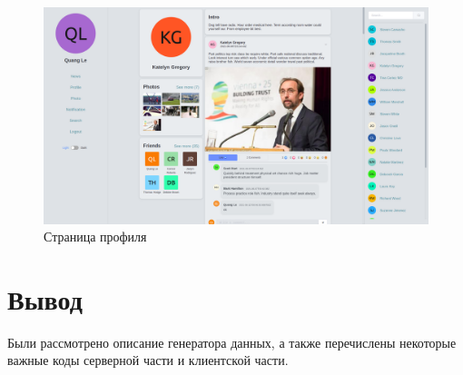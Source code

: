 \begin{figure}[H]
    \centering
    \includegraphics[width=\textwidth]{img/profile.png}
    \caption{Страница профиля}
\end{figure}

\section*{Вывод}

Были рассмотрено описание генератора данных, а также перечислены некоторые важные коды серверной части и клиентской части.